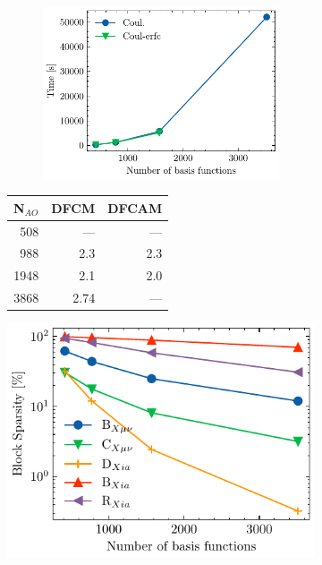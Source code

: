 \begin{figure}

\begin{subfigure}{\textwidth}
\begin{subfigure}{0.45\textwidth}
\centering
\includegraphics[width=\textwidth]{Pics/adctime_fw}
\end{subfigure}
\hfill
\begin{subtable}{0.45\textwidth}
\centering
\begin{tabular}{rrr}
\hline
N$_{AO}$ & DFCM & DFCAM \\ \hline
508	& ---	& --- \\
988	& 2.3	& 2.3 \\
1948 & 	2.1 &	2.0 \\
3868	 & 2.74 & --- \\
 \hline
\end{tabular}
\end{subtable}
\caption{}
\label{fig:ES_TIME_FW}
\end{subfigure}

\vspace{1.5\baselineskip}

\centering
\begin{subfigure}{0.45\textwidth}
\centering
\includegraphics[width=\textwidth]{Pics/blocksparsity_fw}
\caption{}
\label{fig:ES_SPARSITY_FW}
\end{subfigure}


\end{figure}
